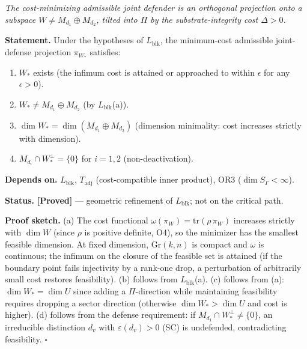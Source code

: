 \documentclass[11pt]{article}
\theoremstyle{remark}
\begin{document}
\begin{tcolorbox}[apfbox, title={Lemma $L_\Pi$ --- Geometric Strengthening: Codespace Rotation}]
\label{lem:L_Pi}
\textit{The cost-minimizing admissible joint defender is an orthogonal projection onto a subspace $W \ne M_{d_1} \oplus M_{d_2}$, tilted into $\Pi$ by the substrate-integrity cost $\Delta > 0$.}

\smallskip\noindent\textbf{Statement.}  Under the hypotheses of $L_{\mathrm{blk}}$, the minimum-cost admissible joint-defense projection $\pi_{W_*}$ satisfies:
\begin{enumerate}[nosep,leftmargin=2em,itemsep=2pt,label=(\alph*)]
\item $W_*$ exists (the infimum cost is attained or approached to within $\epsilon$ for any $\epsilon > 0$).
\item $W_* \ne M_{d_1} \oplus M_{d_2}$ (by $L_{\mathrm{blk}}$(a)).
\item $\dim W_* = \dim(M_{d_1} \oplus M_{d_2})$ (dimension minimality: cost increases strictly with dimension).
\item $M_{d_i} \cap W_*^\perp = \{0\}$ for $i = 1,2$ (non-deactivation).
\end{enumerate}

\smallskip\noindent\textbf{Depends on.}  $L_{\mathrm{blk}}$, $T_{\mathrm{adj}}$ (cost-compatible inner product), OR3 ($\dim S_\Gamma < \infty$).

\smallskip\noindent\textbf{Status.}  \textbf{[Proved]} --- geometric refinement of $L_{\mathrm{blk}}$; not on the critical path.

\smallskip\noindent\textbf{Proof sketch.}  (a) The cost functional $\omega(\pi_W) = \mathrm{tr}(\rho\,\pi_W)$ increases strictly with $\dim W$ (since $\rho$ is positive definite, O4), so the minimizer has the smallest feasible dimension.  At fixed dimension, $\mathrm{Gr}(k,n)$ is compact and $\omega$ is continuous; the infimum on the closure of the feasible set is attained (if the boundary point fails injectivity by a rank-one drop, a perturbation of arbitrarily small cost restores feasibility).  (b) follows from $L_{\mathrm{blk}}$(a).  (c) follows from (a): $\dim W_* = \dim U$ since adding a $\Pi$-direction while maintaining feasibility requires dropping a sector direction (otherwise $\dim W_* > \dim U$ and cost is higher).  (d) follows from the defense requirement: if $M_{d_1} \cap W_*^\perp \ne \{0\}$, an irreducible distinction $d_v$ with $\varepsilon(d_v) > 0$ (SC) is undefended, contradicting feasibility.  \hfill$\square$
\end{tcolorbox}
\end{document}
